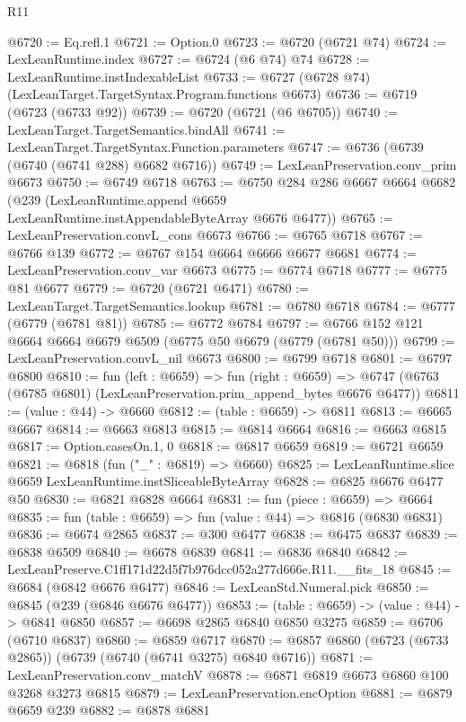 \begin{lexlean}{R11}
\begin{coremodule}
@6720 := Eq.refl.{1}
@6721 := Option.{0}
@6723 := @6720 (@6721 @74)
@6724 := LexLeanRuntime.index
@6727 := @6724 (@6 @74) @74
@6728 := LexLeanRuntime.instIndexableList
@6733 := @6727 (@6728 @74) (LexLeanTarget.TargetSyntax.Program.functions @6673)
@6736 := @6719 (@6723 (@6733 @92))
@6739 := @6720 (@6721 (@6 @6705))
@6740 := LexLeanTarget.TargetSemantics.bindAll
@6741 := LexLeanTarget.TargetSyntax.Function.parameters
@6747 := @6736 (@6739 (@6740 (@6741 @288) @6682 @6716))
@6749 := LexLeanPreservation.conv_prim @6673
@6750 := @6749 @6718
@6763 := @6750
    @284
    @286
    @6667
    @6664
    @6682
    (@239 (LexLeanRuntime.append @6659 LexLeanRuntime.instAppendableByteArray @6676 @6477))
@6765 := LexLeanPreservation.convL_cons @6673
@6766 := @6765 @6718
@6767 := @6766 @139
@6772 := @6767 @154 @6664 @6666 @6677 @6681
@6774 := LexLeanPreservation.conv_var @6673
@6775 := @6774 @6718
@6777 := @6775 @81 @6677
@6779 := @6720 (@6721 @6471)
@6780 := LexLeanTarget.TargetSemantics.lookup
@6781 := @6780 @6718
@6784 := @6777 (@6779 (@6781 @81))
@6785 := @6772 @6784
@6797 := @6766 @152 @121 @6664 @6664 @6679 @6509 (@6775 @50 @6679 (@6779 (@6781 @50)))
@6799 := LexLeanPreservation.convL_nil @6673
@6800 := @6799 @6718
@6801 := @6797 @6800
@6810 := fun (left : @6659) =>
  fun (right : @6659) =>
  @6747 (@6763 (@6785 @6801) (LexLeanPreservation.prim_append_bytes @6676 @6477))
@6811 := (value : @44) -> @6660
@6812 := (table : @6659) -> @6811
@6813 := @6665 @6667
@6814 := @6663 @6813
@6815 := @6814 @6664
@6816 := @6663 @6815
@6817 := Option.casesOn.{1, 0}
@6818 := @6817 @6659
@6819 := @6721 @6659
@6821 := @6818 (fun ("_" : @6819) => @6660)
@6825 := LexLeanRuntime.slice @6659 LexLeanRuntime.instSliceableByteArray
@6828 := @6825 @6676 @6477 @50
@6830 := @6821 @6828 @6664
@6831 := fun (piece : @6659) => @6664
@6835 := fun (table : @6659) => fun (value : @44) => @6816 (@6830 @6831)
@6836 := @6674 @2865
@6837 := @300 @6477
@6838 := @6475 @6837
@6839 := @6838 @6509
@6840 := @6678 @6839
@6841 := @6836 @6840
@6842 := LexLeanPreserve.C1ff171d22d5f7b976dcc052a277d666e.R11.__fits_18
@6845 := @6684 (@6842 @6676 @6477)
@6846 := LexLeanStd.Numeral.pick
@6850 := @6845 (@239 (@6846 @6676 @6477))
@6853 := (table : @6659) -> (value : @44) -> @6841 @6850
@6857 := @6698 @2865 @6840 @6850 @3275
@6859 := @6706 (@6710 @6837)
@6860 := @6859 @6717
@6870 := @6857 @6860 (@6723 (@6733 @2865)) (@6739 (@6740 (@6741 @3275) @6840 @6716))
@6871 := LexLeanPreservation.conv_matchV
@6878 := @6871 @6819 @6673 @6860 @100 @3268 @3273 @6815
@6879 := LexLeanPreservation.encOption
@6881 := @6879 @6659 @239
@6882 := @6878 @6881

\end{coremodule}
\end{lexlean}
